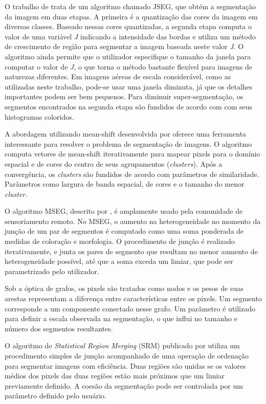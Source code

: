 O trabalho de  trata de um algoritmo chamado JSEG, que obtém a segmentação da imagem em duas etapas. A primeira é a  quantização das cores da imagem em diversas classes. Baseado nessas cores quantizadas, a segunda etapa computa o valor de uma variável \textit{J} indicando a intensidade das bordas e utiliza um método de crescimento de região para segmentar a imagem baseada neste valor \textit{J}. O algoritmo ainda permite que o utilizador especifique o tamanho da janela para computar o valor de \textit{J}, o que torna o método bastante flexível para imagens de naturezas diferentes. Em imagens aéreas de escala considerável, como as utilizadas neste trabalho, pode-se usar uma janela diminuta, já que os detalhes importantes podem ser bem pequenos. Para diminuir super-segmentação, os segmentos encontrados na segunda etapa são fundidos de acordo com com seus histogramas coloridos.

A abordagem utilizando mean-shift desenvolvida por  oferece uma ferramenta interessante para resolver o problema de segmentação de imagens. O algoritmo computa vetores de mean-shift iterativamente para mapear pixels para o domínio espacial e de cores do centro de seus agrupamentos (\textit{clusters}). Após a convergência, os \textit{clusters} são fundidos de acordo com parâmetros de similaridade. Parâmetros como largura de banda espacial, de cores e o tamanho do menor \textit{cluster}.

O algoritmo MSEG, descrito por , é amplamente usado pela comunidade de sensoriamento remoto. No MSEG, o aumento na heterogeneidade no momento da junção de um par de segmentos é computado como uma soma ponderada de medidas de coloração e morfologia. O procedimento de junção é realizado iterativamente, e  junta os pares de segmento que resultam no menor aumento de heterogeneidade possível, até que a soma exceda um limiar, que pode ser parametrizado pelo utilizador.

Sob a óptica de grafos, os pixels são tratados como nodos e os pesos de suas arestas representam a diferença entre características entre os pixels. Um segmento corresponde a um componente conectado nesse grafo. Um parâmetro é utilizado para definir a escala observada na segmentação, o que influi no tamanho e número dos segmentos resultantes.

O algoritmo de \textit{Statistical Region Merging} (SRM) publicado por  utiliza um procedimento simples de junção acompanhado de uma operação de ordenação para segmentar imagens com eficiência. Duas regiões são unidas se os valores médios dos pixels das duas regiões estão mais próximos que um limiar previamente definido. A coesão da segmentação pode ser controlada por um parâmetro definido pelo usuário.

